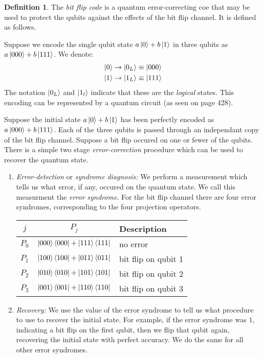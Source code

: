 \documentclass[11pt,a4paper]{article}
\theoremstyle{definition}
\newtheorem{definition}{Definition}[section]
\theoremstyle{plain}
\theoremstyle{remark}
\begin{document}
\begin{definition}
  The \emph{bit flip code} is a quantum error-correcting coe that may be used to protect the qubits against the effects of the bit flip channel. It is defined as follows. 

  Suppose we encode the single qubit state $a \ket{0} + b \ket{1}$ in three qubits as $a \ket{000} + b \ket{111}$. We denote: 
  \begin{align*}
    \ket{0} \to \ket{0_L} \equiv \ket{000} \\
    \ket{1} \to \ket{1_L} \equiv \ket{111}
  \end{align*}
  The notation $\ket{0_L}$ and $\ket{1_l}$ indicate that these are the \emph{logical} states. 
  This encoding can be represented by a quantum circuit (as seen on page 428).
\end{definition}

Suppose the initial state $a \ket{0} + b \ket{1}$ has been perfectly encoded as $a \ket{000} + b \ket{111}$. 
Each of the three qubits is passed through an independant copy of the bit flip channel. Suppose a bit flip occured on one or fewer of the qubits. There is a simple 
two stage \emph{error-correction} procedure which can be used to recover the quantum state. 

\begin{enumerate}
  \item \emph{Error-detection} or \emph{syndrome diagnosis:} We perform a measurement which tells us what error, if any, occured on the quantum state. 
  We call this measurment the \emph{error syndrome}. For the bit flip channel there are four error syndromes, corresponding to the four projection operators. 
  \center 
  \begin{table}[h]
  \centering
  \begin{tabular}{c|c|l}
  \hline
    $j$ & $P_j$ & Description \\
    \hline
    $P_0$ & $\ket{000}\bra{000} + \ket{111}\bra{111}$ & no error \\
    $P_1$ & $\ket{100}\bra{100} + \ket{011}\bra{011}$ & bit flip on qubit 1 \\
    $P_2$ & $\ket{010}\bra{010} + \ket{101}\bra{101}$ & bit flip on qubit 2 \\
    $P_3$ & $\ket{001}\bra{001} + \ket{110}\bra{110}$ & bit flip on qubit 3 \\
  \hline
  \end{tabular}
  \end{table}

  
  \item \emph{Recovery:} We use the value of the error syndrome to tell us what procedure to use 
  to recover the initial state. 
  For example, if the error syndrome was $1$, indicating a bit flip on the first qubit, then we flip that qubit again, recovering the initial state with perfect accuracy. We do the same for 
  all other error syndromes. 
\end{enumerate}
\end{document}
